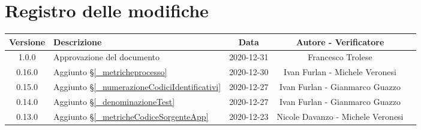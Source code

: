 \section*{Registro delle modifiche}

\begin{center}
	\begin{longtable}{|c|p{5cm}|c|c|c|}
		\hline
		\rowcolor{lighter-grayer}
		\textbf{Versione} & \textbf{Descrizione} & \textbf{Data} & \textbf{Autore - Verificatore} \\
		\hline
		\endfirsthead

		1.0.0 & Approvazione del documento & 2020-12-31 & Francesco Trolese \\
		0.16.0 & Aggiunto \S\ref{_metricheprocesso} & 2020-12-30 & Ivan Furlan - Michele Veronesi \\
		0.15.0 & Aggiunto \S\ref{_numerazioneCodiciIdentificativi} & 2020-12-27 & Ivan Furlan - Gianmarco Guazzo \\
		0.14.0 & Aggiunto \S\ref{_denominazioneTest} & 2020-12-27 & Ivan Furlan - Gianmarco Guazzo  \\
		0.13.0 & %
		Aggiunto \S\ref{_metricheCodiceSorgenteApp} & 2020-12-23 & Nicole Davanzo - Michele Veronesi  \\
		


\end{longtable}
\end{center}
